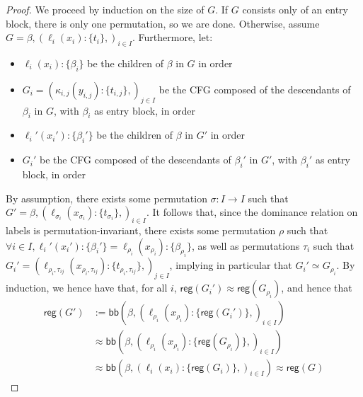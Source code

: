 \documentclass[acmsmall,screen,review]{acmart}
\newcommand{\ms}[1]{\ensuremath{\mathsf{#1}}}
\newcommand{\lto}{:}
\newcommand{\wbranch}[3]{#1(#2) \lto \{#3\}}
\newcommand{\teqv}{\approx}
\newcommand{\adddom}[2]{\ms{bb}(#1, #2)}
\newcommand{\toreg}[1]{\ms{reg}(#1)}
\begin{document}
\cfgperminvar*

\label{proof:cfg-perm-invar}

\begin{proof}
  We proceed by induction on the size of $G$. If $G$ consists only of an entry block, there is only
  one permutation, so we are done. Otherwise, assume $G = \beta, (\wbranch{\ell_i}{x_i}{t_i},)_{i
  \in I}$. Furthermore, let:
  \begin{itemize}
    \item $\wbranch{\ell_i}{x_i}{\beta_i}$ be the children of $\beta$ in $G$ in order
    \item $G_i = (\wbranch{\kappa_{i, j}}{y_{i, j}}{t_{i, j}},)_{j \in I}$ be the CFG composed of
    the descendants of $\beta_i$ in $G$, with $\beta_i$ as entry block, in order
    \item $\wbranch{\ell_i'}{x_i'}{\beta_i'}$ be the children of $\beta$ in $G'$ in order
    \item $G_i'$ be the CFG composed of the descendants of $\beta_i'$ in $G'$, with $\beta_i'$ as
    entry block, in order
  \end{itemize}
  By assumption, there exists some permutation $\sigma: I \to I$ such that $G' = \beta,
  (\wbranch{\ell_{\sigma_i}}{x_{\sigma_i}}{t_{\sigma_i}},)_{i \in I}$. It follows that, since the
  dominance relation on labels is permutation-invariant, there exists some permutation $\rho$ such
  that $\forall i \in I, \wbranch{\ell_i'}{x_i'}{\beta_i'} =
  \wbranch{\ell_{\rho_i}}{x_{\rho_i}}{\beta_{\rho_i}}$, as well as permutations $\tau_i$ such that
  $G_i' = (\wbranch{\ell_{\rho_i, \tau_{ij}}}{x_{\rho_i, \tau_{ij}}}{t_{\rho_i, \tau_{ij}}},)_{j \in
  I}$, implying in particular that $G_i' \simeq G_{\rho_i}$. By induction, we hence have that, for
  all $i$, $\toreg{G_i'} \teqv \toreg{G_{\rho_i}}$, and hence that
  \begin{equation}
    \begin{aligned}
    \toreg{G'} &:= \adddom{\beta}{(\wbranch{\ell_{\rho_i}}{x_{\rho_i}}{\toreg{G_i'}},)_{i \in I}} \\
    &\teqv \adddom{\beta}{(\wbranch{\ell_{\rho_i}}{x_{\rho_i}}{\toreg{G_{\rho_i}}},)_{i \in I}} \\
    &\teqv \adddom{\beta}{(\wbranch{\ell_i}{x_i}{\toreg{G_i}},)_{i \in I}} \teqv \toreg{G}
    \end{aligned}
  \end{equation}
\end{proof}

\cfgconversion*
\end{document}

